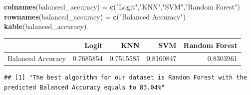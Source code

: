 \documentclass[
]{article}
\newenvironment{Shaded}{\begin{snugshade}}{\end{snugshade}}
\newcommand{\DecValTok}[1]{\textcolor[rgb]{0.00,0.00,0.81}{#1}}
\newcommand{\KeywordTok}[1]{\textcolor[rgb]{0.13,0.29,0.53}{\textbf{#1}}}
\newcommand{\NormalTok}[1]{#1}
\newcommand{\OperatorTok}[1]{\textcolor[rgb]{0.81,0.36,0.00}{\textbf{#1}}}
\newcommand{\StringTok}[1]{\textcolor[rgb]{0.31,0.60,0.02}{#1}}
\begin{document}
\begin{Shaded}
\begin{Highlighting}[]
\KeywordTok{colnames}\NormalTok{(balanced_accuracy) =}\StringTok{ }\KeywordTok{c}\NormalTok{(}\StringTok{"Logit"}\NormalTok{,}\StringTok{"KNN"}\NormalTok{,}\StringTok{"SVM"}\NormalTok{,}\StringTok{"Random Forest"}\NormalTok{)}
\KeywordTok{rownames}\NormalTok{(balanced_accuracy) =}\StringTok{ }\KeywordTok{c}\NormalTok{(}\StringTok{"Balanced Accuracy"}\NormalTok{)}
\KeywordTok{kable}\NormalTok{(balanced_accuracy)}
\end{Highlighting}
\end{Shaded}

\begin{longtable}[]{@{}lrrrr@{}}
\toprule
& Logit & KNN & SVM & Random Forest\tabularnewline
\midrule
\endhead
Balanced Accuracy & 0.7685854 & 0.7515585 & 0.8160847 &
0.8303961\tabularnewline
\bottomrule
\end{longtable}

\begin{Shaded}
\end{Shaded}

\begin{verbatim}
## [1] "The best algorithm for our dataset is Random Forest with the predicted Balanced Accuracy equals to 83.04%"
\end{verbatim}
\end{document}
